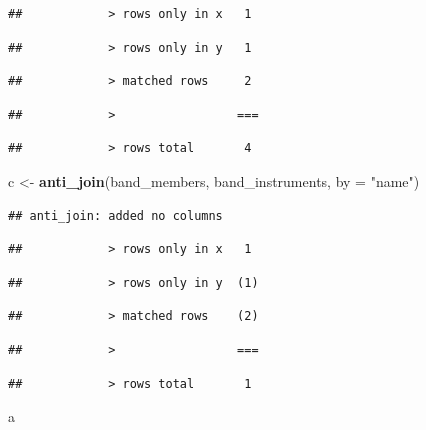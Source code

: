 \documentclass[
]{book}
\newenvironment{Shaded}{\begin{snugshade}}{\end{snugshade}}
\newcommand{\DataTypeTok}[1]{\textcolor[rgb]{0.13,0.29,0.53}{#1}}
\newcommand{\KeywordTok}[1]{\textcolor[rgb]{0.13,0.29,0.53}{\textbf{#1}}}
\newcommand{\NormalTok}[1]{#1}
\newcommand{\StringTok}[1]{\textcolor[rgb]{0.31,0.60,0.02}{#1}}
\begin{document}
\begin{verbatim}
##            > rows only in x   1
\end{verbatim}

\begin{verbatim}
##            > rows only in y   1
\end{verbatim}

\begin{verbatim}
##            > matched rows     2
\end{verbatim}

\begin{verbatim}
##            >                 ===
\end{verbatim}

\begin{verbatim}
##            > rows total       4
\end{verbatim}

\begin{Shaded}
\begin{Highlighting}[]
\NormalTok{c <-}\StringTok{ }\KeywordTok{anti_join}\NormalTok{(band_members, band_instruments, }\DataTypeTok{by =} \StringTok{"name"}\NormalTok{)}
\end{Highlighting}
\end{Shaded}

\begin{verbatim}
## anti_join: added no columns
\end{verbatim}

\begin{verbatim}
##            > rows only in x   1
\end{verbatim}

\begin{verbatim}
##            > rows only in y  (1)
\end{verbatim}

\begin{verbatim}
##            > matched rows    (2)
\end{verbatim}

\begin{verbatim}
##            >                 ===
\end{verbatim}

\begin{verbatim}
##            > rows total       1
\end{verbatim}

\begin{Shaded}
\begin{Highlighting}[]
\NormalTok{a}
\end{Highlighting}
\end{Shaded}
\end{document}
